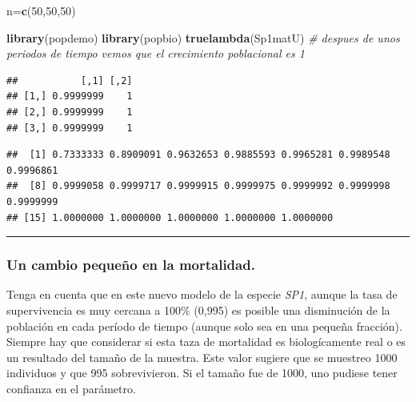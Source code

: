 \documentclass[
]{book}
\newenvironment{Shaded}{\begin{snugshade}}{\end{snugshade}}
\newcommand{\AttributeTok}[1]{\textcolor[rgb]{0.13,0.29,0.53}{#1}}
\newcommand{\CommentTok}[1]{\textcolor[rgb]{0.56,0.35,0.01}{\textit{#1}}}
\newcommand{\DecValTok}[1]{\textcolor[rgb]{0.00,0.00,0.81}{#1}}
\newcommand{\FunctionTok}[1]{\textcolor[rgb]{0.13,0.29,0.53}{\textbf{#1}}}
\newcommand{\NormalTok}[1]{#1}
\newcommand{\OtherTok}[1]{\textcolor[rgb]{0.56,0.35,0.01}{#1}}
\newcommand{\SpecialCharTok}[1]{\textcolor[rgb]{0.81,0.36,0.00}{\textbf{#1}}}
\theoremstyle{definition}
\theoremstyle{definition}
\theoremstyle{definition}
\theoremstyle{definition}
\theoremstyle{remark}
\begin{document}
\begin{Shaded}
\begin{Highlighting}[]
\NormalTok{n}\OtherTok{=}\FunctionTok{c}\NormalTok{(}\DecValTok{50}\NormalTok{,}\DecValTok{50}\NormalTok{,}\DecValTok{50}\NormalTok{)}

\FunctionTok{library}\NormalTok{(popdemo)}
\FunctionTok{library}\NormalTok{(popbio)}
\FunctionTok{truelambda}\NormalTok{(Sp1matU) }\CommentTok{\# despues de unos periodos de tiempo vemos que el crecimiento poblacional es 1}
\end{Highlighting}
\end{Shaded}

\begin{verbatim}
##           [,1] [,2]
## [1,] 0.9999999    1
## [2,] 0.9999999    1
## [3,] 0.9999999    1
\end{verbatim}

\begin{Shaded}
\end{Shaded}

\begin{verbatim}
##  [1] 0.7333333 0.8909091 0.9632653 0.9885593 0.9965281 0.9989548 0.9996861
##  [8] 0.9999058 0.9999717 0.9999915 0.9999975 0.9999992 0.9999998 0.9999999
## [15] 1.0000000 1.0000000 1.0000000 1.0000000 1.0000000
\end{verbatim}

\begin{center}\rule{0.5\linewidth}{0.5pt}\end{center}

\subsubsection{Un cambio pequeño en la mortalidad.}\label{un-cambio-pequeuxf1o-en-la-mortalidad.}

Tenga en cuenta que en este nuevo modelo de la especie \emph{SP1}, aunque la tasa de supervivencia es muy cercana a 100\% (0,995) es posible una disminución de la población en cada período de tiempo (aunque solo sea en una pequeña fracción). Siempre hay que considerar si esta taza de mortalidad es biologícamente real o es un resultado del tamaño de la muestra. Este valor sugiere que se muestreo 1000 individuos y que 995 sobrevivieron. Si el tamaño fue de 1000, uno pudiese tener confianza en el parámetro.
\end{document}
